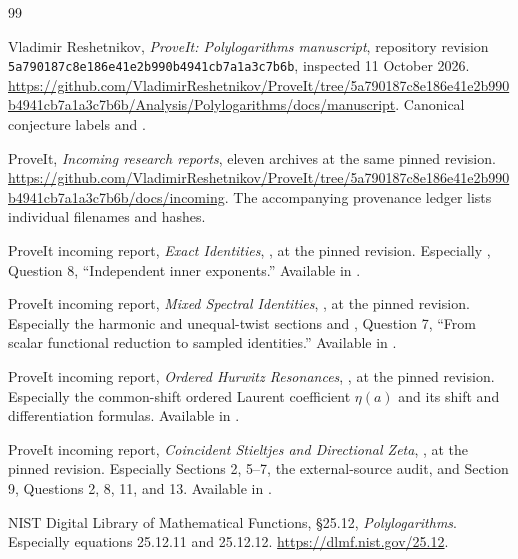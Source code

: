 {}
\begin{thebibliography}{99}
\small
\raggedright

Vladimir Reshetnikov, \emph{ProveIt: Polylogarithms manuscript},
repository revision \texttt{5a790187c8e186e41e2b990b4941cb7a1a3c7b6b},
inspected 11 October 2026.
\url{https://github.com/VladimirReshetnikov/ProveIt/tree/5a790187c8e186e41e2b990b4941cb7a1a3c7b6b/Analysis/Polylogarithms/docs/manuscript}.
Canonical conjecture labels  and
.

ProveIt, \emph{Incoming research reports}, eleven archives at the
same pinned revision.
\url{https://github.com/VladimirReshetnikov/ProveIt/tree/5a790187c8e186e41e2b990b4941cb7a1a3c7b6b/docs/incoming}.
The accompanying provenance ledger lists individual filenames and hashes.

ProveIt incoming report, \emph{Exact Identities},
, at the pinned revision.
Especially , Question 8,
``Independent inner exponents.'' Available in \cite{RepoIncoming}.

ProveIt incoming report, \emph{Mixed Spectral Identities},
, at the pinned
revision. Especially the harmonic and unequal-twist sections and
, Question 7,
``From scalar functional reduction to sampled identities.''
Available in \cite{RepoIncoming}.

ProveIt incoming report, \emph{Ordered Hurwitz Resonances},
, at the pinned
revision. Especially the common-shift ordered Laurent coefficient
$\eta(a)$ and its shift and differentiation formulas.
Available in \cite{RepoIncoming}.

ProveIt incoming report, \emph{Coincident Stieltjes and Directional Zeta},
,
at the pinned revision. Especially Sections 2, 5--7, the external-source
audit, and Section 9, Questions 2, 8, 11, and 13.
Available in \cite{RepoIncoming}.





NIST Digital Library of Mathematical Functions, \S25.12,
\emph{Polylogarithms}. Especially equations 25.12.11 and 25.12.12.
\url{https://dlmf.nist.gov/25.12}.


\end{thebibliography}
